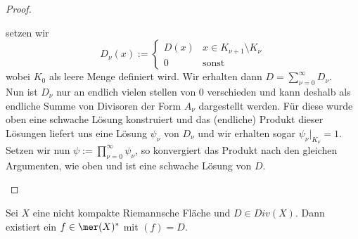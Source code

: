 \begin{proof}
\begin{itemize}
  setzen wir
  \[
  D_\nu(x) := \begin{cases} D(x) & x \in K_{\nu+1}\setminus K_\nu\\ 0
    & \text{sonst}\end{cases}
  \]
  wobei $K_0$ als leere Menge definiert wird. Wir erhalten dann $D =
  \sum_{\nu = 0}^\infty D_\nu$. \\
  Nun ist $D_\nu$ nur an endlich vielen stellen von 0 verschieden und
  kann deshalb als endliche Summe von Divisoren der Form $A_\nu$
  dargestellt werden. Für diese wurde oben eine schwache Lösung
  konstruiert und das (endliche) Produkt dieser Lösungen liefert uns
  eine Lösung $\psi_\nu$ von $D_\nu$ und wir erhalten sogar $\psi_\nu
  |_{K_\nu} = 1$. \\
  Setzen wir nun $\psi := \prod_{\nu=0}^\infty \psi_\nu$, so
  konvergiert das Produkt nach den gleichen Argumenten, wie oben und
  ist eine schwache Lösung von $D$.
  \end{itemize}
\end{proof}


\begin{thm}
  \label{thm:Lösung-Divisor}
  Sei $X$ eine nicht kompakte Riemannsche Fläche und $D \in
  Div(X)$. Dann existiert ein $f \in \mer(X)^\ast$ mit $(f) = D$.
\end{thm}

